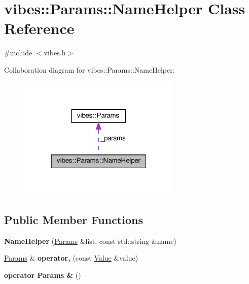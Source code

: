 \hypertarget{classvibes_1_1_params_1_1_name_helper}{}\section{vibes\+:\+:Params\+:\+:Name\+Helper Class Reference}
\label{classvibes_1_1_params_1_1_name_helper}


{\ttfamily \#include $<$vibes.\+h$>$}



Collaboration diagram for vibes\+:\+:Params\+:\+:Name\+Helper\+:\nopagebreak
\begin{figure}[H]
\begin{center}
\leavevmode
\includegraphics[width=220pt]{classvibes_1_1_params_1_1_name_helper__coll__graph}
\end{center}
\end{figure}
\subsection*{Public Member Functions}
\begin{DoxyCompactItemize}
\item 
\mbox{\label{classvibes_1_1_params_1_1_name_helper_a8c36d219cfbc9793399bad5075982fe7}} 
{\bfseries Name\+Helper} (\hyperlink{classvibes_1_1_params}{Params} \&list, const std\+::string \&name)
\item 
\mbox{\label{classvibes_1_1_params_1_1_name_helper_ae8ac305de21004ba4233570273ce631c}} 
\hyperlink{classvibes_1_1_params}{Params} \& {\bfseries operator,} (const \hyperlink{classvibes_1_1_value}{Value} \&value)
\item 
\mbox{\label{classvibes_1_1_params_1_1_name_helper_ae0d070b43cc33009f5854a159299180b}} 
{\bfseries operator Params \&} ()
\end{DoxyCompactItemize}
